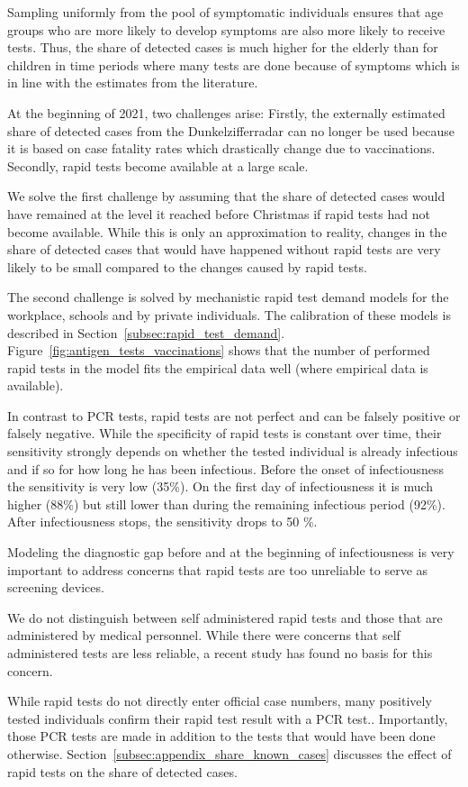 Sampling uniformly from the pool of symptomatic individuals ensures that age groups who
are more likely to develop symptoms are also more likely to receive tests. Thus, the
share of detected cases is much higher for the elderly than for children in time periods
where many tests are done because of symptoms which is in line with the estimates from
the literature.

At the beginning of 2021, two challenges arise: Firstly, the externally estimated share
of detected cases from the Dunkelzifferradar can no longer be used because it is based on
case fatality rates which drastically change due to vaccinations. Secondly, rapid tests
become available at a large scale.

We solve the first challenge by assuming that the share of detected cases would have
remained at the level it reached before Christmas if rapid tests had not become
available. While this is only an approximation to reality, changes in the share of
detected cases that would have happened without rapid tests are very likely to be small
compared to the changes caused by rapid tests.

The second challenge is solved by mechanistic rapid test demand models for the workplace,
schools and by private individuals. The calibration of these models is described in
Section~\ref{subsec:rapid_test_demand}. Figure~\ref{fig:antigen_tests_vaccinations} shows
that the number of performed rapid tests in the model fits the empirical data well (where
empirical data is available).

In contrast to PCR tests, rapid tests are not perfect and can be falsely positive or
falsely negative. While the specificity of rapid tests is constant over time, their
sensitivity strongly depends on whether the tested individual is already infectious and
if so for how long he has been infectious. Before the onset of infectiousness the
sensitivity is very low (35\%). On the first day of infectiousness it is much higher
(88\%) but still lower than during the remaining infectious period (92\%). After
infectiousness stops, the sensitivity drops to 50 \%.

Modeling the diagnostic gap before and at the beginning of infectiousness is very
important to address concerns that rapid tests are too unreliable to serve as screening
devices.

We do not distinguish between self administered rapid tests and those that are
administered by medical personnel. While there were concerns that self administered tests
are less reliable, a recent study has found no basis for this concern.

While rapid tests do not directly enter official case numbers, many positively tested
individuals confirm their rapid test result with a PCR test..
Importantly, those PCR tests are made in addition to the tests that would have been
done otherwise. Section~\ref{subsec:appendix_share_known_cases} discusses the effect
of rapid tests on the share of detected cases.
